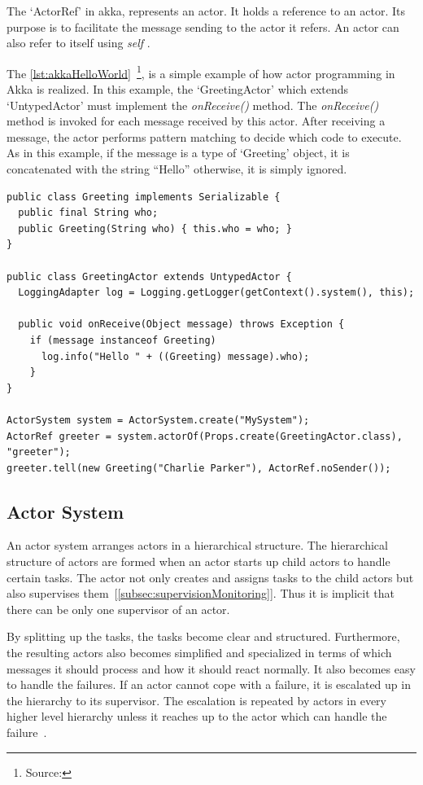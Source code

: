   The ‘ActorRef’ in akka, represents an actor. It holds a reference to an actor. Its purpose is to facilitate the message sending to the actor it refers. An actor can also refer to itself using \emph{self} \cite{akkaJavaDoc}.

  The \autoref{lst:akkaHelloWorld}~\footnote{Source: }, is a simple example of how actor programming in Akka is realized. In this example, the ‘GreetingActor’ which extends ‘UntypedActor’ must implement the \emph{onReceive()} method. The \emph{onReceive()} method is invoked for each message received by this actor. After receiving a message, the actor performs pattern matching to decide which code to execute. As in this example, if the message is a type of ‘Greeting’ object, it is concatenated with the string “Hello” otherwise, it is simply ignored.

\begin{lstlisting}[caption=A simple example of actor programming in akka~\cite{akkaHome}, label=lst:akkaHelloWorld]
public class Greeting implements Serializable {
  public final String who;
  public Greeting(String who) { this.who = who; }
}

public class GreetingActor extends UntypedActor {
  LoggingAdapter log = Logging.getLogger(getContext().system(), this);

  public void onReceive(Object message) throws Exception {
    if (message instanceof Greeting)
      log.info("Hello " + ((Greeting) message).who);
    }
}

ActorSystem system = ActorSystem.create("MySystem");
ActorRef greeter = system.actorOf(Props.create(GreetingActor.class), "greeter");
greeter.tell(new Greeting("Charlie Parker"), ActorRef.noSender());
\end{lstlisting}


  \subsection{Actor System}
  \label{subsec:actorSystem}
    An actor system arranges actors in a hierarchical structure. The hierarchical structure of actors are formed when an actor starts up child actors to handle certain tasks. The actor not only creates and assigns tasks to the child actors but also supervises them~[\autoref{subsec:supervisionMonitoring}]. Thus it is implicit that there can be only one supervisor of an actor.

  By splitting up the tasks, the tasks become clear and structured. Furthermore, the resulting actors also becomes simplified and specialized in terms of which messages it should process and how it should react normally. It also becomes easy to handle the failures. If an actor cannot cope with a failure, it is escalated up in the hierarchy to its supervisor. The escalation is repeated by actors in every higher level hierarchy unless it reaches up to the actor which can handle the failure~\cite{akkaJavaDoc}.

